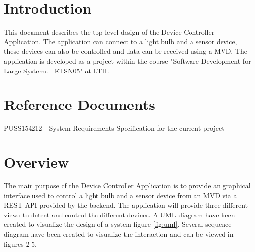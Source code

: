 \documentclass[a4paper]{article}
\begin{document}
	
	\tableofcontents
	\newpage
	
	\section{Introduction}
	This document describes the top level design of the Device Controller Application. The application can connect to a light bulb and a sensor device, these devices can also be controlled and data can be received using a MVD. The application is developed as a project within the course "Software Development for Large Systems - ETSN05" at LTH.
	
	\section{Reference Documents}
	PUSS154212 - System Requirements Specification for the current project
	
	
	\section{Overview}
	The main purpose of the Device Controller Application is to provide an graphical interface used to control a light bulb and a sensor device from an MVD via a REST API provided by the backend. The application will provide three different views to detect and control the different devices. A UML diagram have been created to visualize the design of a system figure \ref{fig:uml}. Several sequence diagram have been created to visualize the interaction and can be viewed in figures 2-5.
	
\end{document}
